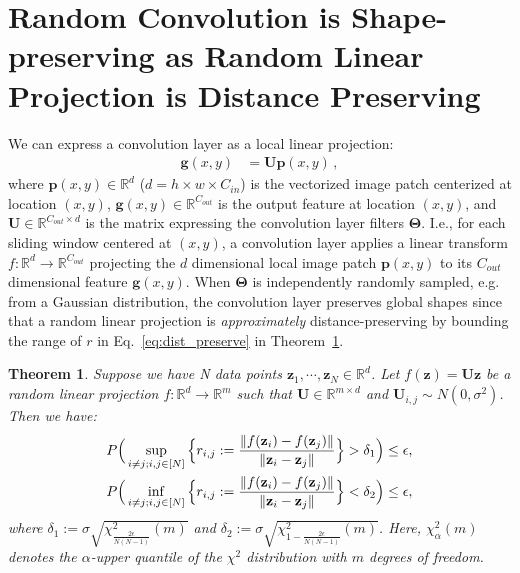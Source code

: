 \documentclass{article} \usepackage{iclr2021_conference,times}
\newtheorem{theorem}{Theorem}
\newcommand{\norms}[1]{\Vert#1\Vert}
\begin{document}
\section{Random Convolution is Shape-preserving as Random Linear Projection is Distance Preserving}
\label{theorem_proof}

We can express a convolution layer as a local linear projection:
\begin{align}
\label{eq:local_projection}
\mathbf{g}(x, y) & = \mathbf{U}\mathbf{p}(x,y)\,,
\end{align}
where $\mathbf{p}(x,y)\in\mathbb{R}^{d}$ ($d = h \times w \times C_{in}$) is the vectorized image patch centerized at location $(x,y)$, $\mathbf{g}(x,y)\in\mathbb{R}^{C_{out}}$ is the output feature at location $(x,y)$, and $\mathbf{U}\in\mathbb{R}^{C_{out}\times d }$ is the matrix expressing the convolution layer filters $\mathbf{\Theta}$. I.e., for each sliding window centered at $(x, y)$, a convolution layer applies a linear transform $f: \mathbb{R}^{d}\rightarrow\mathbb{R}^{C_{out}} $ projecting the $d$ dimensional local image patch $\mathbf{p}(x,y)$ to its $C_{out}$ dimensional feature $\mathbf{g}(x, y)$. When $\mathbf{\Theta}$ is independently randomly sampled, e.g. from a Gaussian distribution, the convolution layer preserves global shapes since that a random linear projection is \emph{approximately} distance-preserving by bounding the range of $r$ in Eq.~\ref{eq:dist_preserve} in Theorem~\ref{theorem1}.

\begin{theorem}
	\label{theorem1}
	Suppose we have N data points $\mathbf{z}_1,\cdots, \mathbf{z}_N \in \mathbb{R}^d$. Let $f(\mathbf{z}) = \mathbf{U} \mathbf{z}$ be a random linear projection $f: \mathbb{R}^{d}\rightarrow\mathbb{R}^{m} $ such that $\mathbf{U} \in \mathbb{R}^{m \times d}$ and $\mathbf{U}_{i,j} \sim N(0,\sigma^2)$. Then we have:
	\begin{equation}
	\begin{aligned}
	P\Big(\sup_{i\neq j; i,j  \in [N]} \Big\{r_{i,j} :=\frac{\norms{f(\mathbf{z}_i) - f(\mathbf{z}_j)}}{\norms{\mathbf{z}_i - \mathbf{z}_j}} \Big\} > \delta_1 \Big) \leq \epsilon,  \\\vspace{5ex}
	P\Big(\inf_{i\neq j; i,j  \in [N]} \Big\{r_{i,j} :=\frac{\norms{f(\mathbf{z}_i) - f(\mathbf{z}_j)}}{\norms{\mathbf{z}_i - \mathbf{z}_j}} \Big\} < \delta_2 \Big) \leq \epsilon,  
	\end{aligned}
	\end{equation}
	where $\delta_1 := \sigma\sqrt{\chi^2_{\frac{2\epsilon}{N(N-1)}}(m)}$ and $\delta_2 := \sigma\sqrt{\chi^2_{1 - \frac{2\epsilon}{N(N-1)}}(m)}$. Here, $\chi^2_{\alpha}(m)$ denotes the $\alpha$-upper quantile of the $\chi^2$ distribution with $m$ degrees of freedom.
	
\end{theorem}
\end{document}
